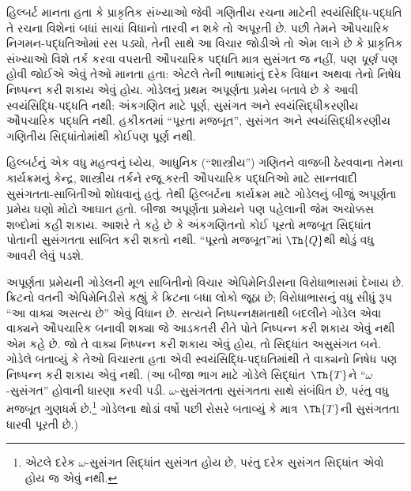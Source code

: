 \OLEndChapterHook
\endgroup


\begingroup
\makeatletter{}\makeatother

\label{guunit:OLP-0312}


\begingroup
\makeatletter{}\makeatother


\label{guunit:OLP-0313}


હિલ્બર્ટ માનતા હતા કે
પ્રાકૃતિક સંખ્યાઓ જેવી
ગણિતીય રચના માટેની
સ્વયંસિદ્ધિ-પદ્ધતિ તે
રચના વિશેનાં બધાં સાચાં
વિધાનો તારવી ન શકે તો
અપૂરતી છે. પછી તેમને
ઔપચારિક નિગમન-પદ્ધતિઓમાં
રસ પડ્યો, તેની સાથે આ
વિચાર જોડીએ તો એમ લાગે
છે કે પ્રાકૃતિક સંખ્યાઓ
વિશે તર્ક કરવા વપરાતી
ઔપચારિક પદ્ધતિ માત્ર
સુસંગત જ નહીં, પણ
\emph{પૂર્ણ} પણ હોવી જોઈએ
એવું તેઓ માનતા હતા:
એટલે તેની ભાષામાંનું દરેક
વિધાન અથવા તેનો નિષેધ
નિષ્પન્ન કરી શકાય એવું હોય.
ગોડેલનું પ્રથમ અપૂર્ણતા
પ્રમેય બતાવે છે કે આવી
સ્વયંસિદ્ધિ-પદ્ધતિ નથી:
અંકગણિત માટે પૂર્ણ,
સુસંગત અને
સ્વયંસિદ્ધીકરણીય
ઔપચારિક પદ્ધતિ નથી.
હકીકતમાં ``પૂરતા મજબૂત'',
સુસંગત અને
સ્વયંસિદ્ધીકરણીય
ગણિતીય સિદ્ધાંતોમાંથી
કોઈપણ પૂર્ણ નથી.

હિલ્બર્ટનું એક વધુ મહત્વનું
ધ્યેય, આધુનિક
(``શાસ્ત્રીય'') ગણિતને
વાજબી ઠેરવવાના તેમના
કાર્યક્રમનું કેન્દ્ર, શાસ્ત્રીય
તર્કને રજૂ કરતી ઔપચારિક
પદ્ધતિઓ માટે સાન્તવાદી
સુસંગતતા-સાબિતીઓ શોધવાનું
હતું. તેથી હિલ્બર્ટના
કાર્યક્રમ માટે ગોડેલનું
બીજું અપૂર્ણતા પ્રમેય
ઘણો મોટો આઘાત હતો.
બીજા અપૂર્ણતા પ્રમેયને પણ
પહેલાની જેમ અચોક્કસ
શબ્દોમાં કહી શકાય.
આશરે તે કહે છે કે
અંકગણિતનો કોઈ પૂરતો
મજબૂત સિદ્ધાંત પોતાની
સુસંગતતા સાબિત કરી
શકતો નથી. ``પૂરતો
મજબૂત''માં $\Th{Q}$થી
થોડું વધુ આવરી લેવું
પડશે.

અપૂર્ણતા પ્રમેયની ગોડેલની
મૂળ સાબિતીનો વિચાર
એપિમેનિડીસના વિરોધાભાસમાં
દેખાય છે. ક્રિટનો વતની
એપિમેનિડીસે કહ્યું કે
ક્રિટના બધા લોકો જૂઠા છે;
વિરોધાભાસનું વધુ સીધું
રૂપ ``આ વાક્ય અસત્ય છે''
એવું વિધાન છે. સત્યને
નિષ્પન્નક્ષમતાથી બદલીને
ગોડેલ એવા વાક્યને
ઔપચારિક બનાવી શક્યા જે
આડકતરી રીતે પોતે
નિષ્પન્ન કરી શકાય એવું નથી એમ
કહે છે. જો તે વાક્ય
નિષ્પન્ન કરી શકાય એવું હોય, તો
સિદ્ધાંત અસુસંગત બને.
ગોડેલે બતાવ્યું કે તેઓ
વિચારતા હતા એવી
સ્વયંસિદ્ધિ-પદ્ધતિમાંથી
તે વાક્યનો નિષેધ
પણ નિષ્પન્ન કરી શકાય એવું નથી.
(આ બીજા ભાગ માટે ગોડેલે
સિદ્ધાંત~$\Th{T}$ને
``$\omega$-સુસંગત''
હોવાની ધારણા કરવી પડી.
$\omega$-સુસંગતતા
સુસંગતતા સાથે સંબંધિત છે,
પરંતુ વધુ મજબૂત ગુણધર્મ
છે.\footnote{એટલે દરેક
$\omega$-સુસંગત સિદ્ધાંત
સુસંગત હોય છે, પરંતુ
દરેક સુસંગત સિદ્ધાંત
એવો હોય જ એવું
નથી.} ગોડેલના થોડાં વર્ષો
પછી રોસરે બતાવ્યું કે
માત્ર~$\Th{T}$ની
સુસંગતતા ધારવી પૂરતી છે.)

